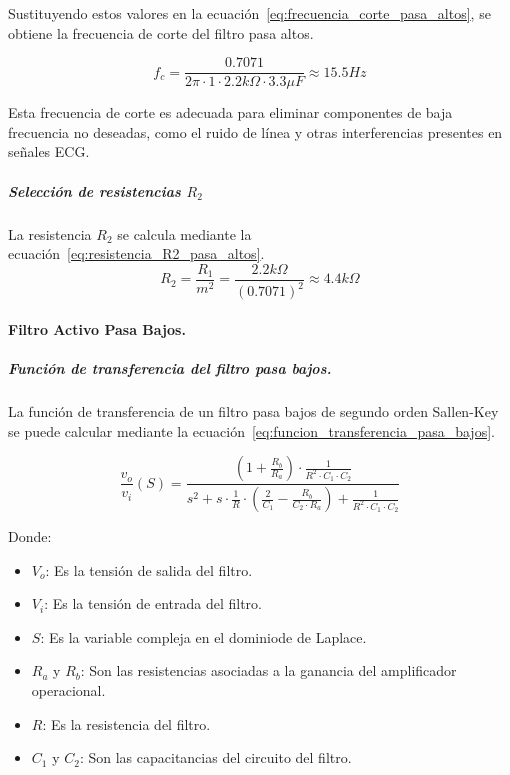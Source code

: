                     Sustituyendo estos valores en la ecuación~\ref{eq:frecuencia_corte_pasa_altos}, se obtiene la frecuencia de corte del filtro pasa altos.

                    \begin{equation}
                        \label{eq:frecuencia_corte_pasa_altos_valor}
                        f_c = \frac{0.7071}{2\pi \cdot 1 \cdot 2.2 k\Omega \cdot 3.3 \mu F} \approx 15.5 Hz
                    \end{equation}

                    Esta frecuencia de corte es adecuada para eliminar componentes de baja frecuencia no deseadas, como el ruido de línea y otras interferencias presentes en señales ECG.

                \subparagraph{Selección de resistencias $R_2$}
                    La resistencia $R_2$ se calcula mediante la ecuación~\ref{eq:resistencia_R2_pasa_altos}.
                    \begin{equation}
                        \label{eq:resistencia_R2_pasa_altos}
                        R_2 = \frac{R_1}{m^2} = \frac{2.2 k\Omega}{(0.7071)^2} \approx 4.4 k\Omega 
                    \end{equation}

            \paragraph{Filtro Activo Pasa Bajos.}
                \subparagraph{Función de transferencia del filtro pasa bajos.}
                    La función de transferencia de un filtro pasa bajos de segundo orden Sallen-Key se puede calcular mediante la ecuación~\ref{eq:funcion_transferencia_pasa_bajos}.

                    \begin{equation}
                        \label{eq:funcion_transferencia_pasa_bajos}
                        \frac{v_o}{v_i}(S) = \frac{(1 + \frac{R_b}{R_a}) \cdot \frac{1}{R^2 \cdot C_1 \cdot C_2}}{s^2 + s \cdot \frac{1}{R} \cdot (\frac{2}{C_1} - \frac{R_b}{C_2 \cdot R_a}) + \frac{1}{R^2 \cdot C_1 \cdot C_2}}
                    \end{equation}

                    Donde:
                    \begin{itemize}
                        \item $V_o$: Es la tensión de salida del filtro.
                        \item $V_i$: Es la tensión de entrada del filtro.
                        \item $S$: Es la variable compleja en el dominiode de Laplace.
                        \item $R_a$ y $R_b$: Son las resistencias asociadas a la ganancia del amplificador operacional.
                        \item $R$: Es la resistencia del filtro.
                        \item $C_1$ y $C_2$: Son las capacitancias del circuito del filtro.
                    \end{itemize}
                    
